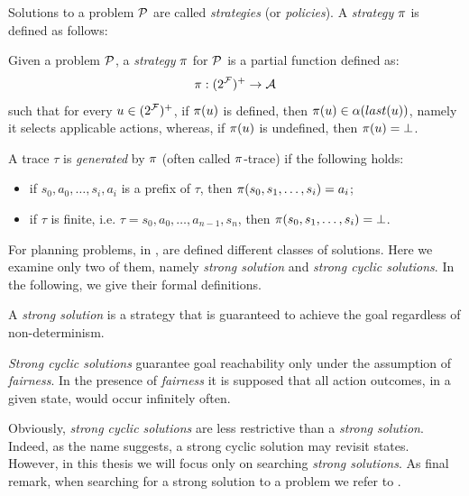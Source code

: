 Solutions to a \FOND problem $\P$ are called \textit{strategies} (or \textit{policies}). A \textit{strategy} $\trace$ is defined as follows:
\begin{definition}\label{def:policy}
Given a \FOND problem $\P$, a \textit{strategy} $\trace$ for $\P$ is a partial function defined as:
\begin{equation}
\trace: (2^\F)^+ \rightarrow \mathcal{A}
\end{equation}
such that for every $u \in (2^\F)^+$, if $\trace(u)$ is defined, then $\trace(u) \in \alpha(last(u))$, namely it selects applicable actions, whereas, if $\trace(u)$ is undefined, then $\trace(u) = \bot$.
\end{definition}
\noindent A trace $\tau$ is \textit{generated} by $\trace$ (often called $\trace$-trace) if the following holds:
\begin{itemize}
\item if $s_0,a_0,\dots,s_i,a_i$ is a prefix of $\tau$, then $\trace(s_0,s_1,\dots,s_i) = a_i$;
\item if $\tau$ is finite, i.e. $\tau = s_0,a_0,\dots,a_{n-1},s_n$, then $\trace(s_0,s_1,\dots,s_i) = \bot$.
\end{itemize}

For \FOND planning problems, in \citep{cimatti2003weak}, are defined different classes of solutions. Here we examine only two of them, namely \textit{strong solution} and \textit{strong cyclic solutions}. In the following, we give their formal definitions.

\begin{definition}\label{def:strong-sol}
A \textit{strong solution} is a strategy that is guaranteed to achieve the goal regardless of non-determinism.
\end{definition}

\begin{definition}\label{def:strong-cyc-sol}
\textit{Strong cyclic solutions} guarantee goal reachability only under the assumption of \textit{fairness}. In the presence of \textit{fairness} it is supposed that all action outcomes, in a given state, would occur infinitely often. 
\end{definition}
Obviously, \textit{strong cyclic solutions} are less restrictive than a \textit{strong solution}.
Indeed, as the name suggests, a strong cyclic solution may revisit states. However, in this thesis we will focus only on searching \textit{strong solutions}. As final remark, when searching for a strong solution to a \FOND problem we refer to \FONDS.

